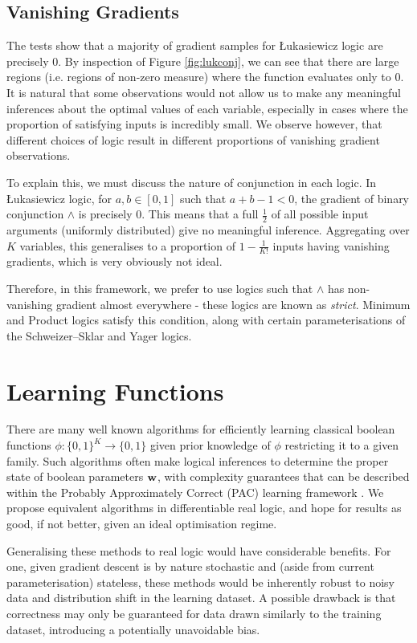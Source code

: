 \subsection{Vanishing Gradients}
\label{section:tnormzerograd}

The tests show that a majority of gradient samples for Łukasiewicz logic are precisely $0$. By inspection of Figure \ref{fig:lukconj}, we can see that there are large regions (i.e. regions of non-zero measure) where the function evaluates only to $0$. It is natural that some observations would not allow us to make any meaningful inferences about the optimal values of each variable, especially in cases where the proportion of satisfying inputs is incredibly small. We observe however, that different choices of logic result in different proportions of vanishing gradient observations.

To explain this, we must discuss the nature of conjunction in each logic. In Łukasiewicz logic, for $a, b \in [0,1]$ such that $a + b - 1 < 0$, the gradient of binary conjunction $\land$ is precisely $0$. This means that a full $\frac{1}{2}$ of all possible input arguments (uniformly distributed) give no meaningful inference. Aggregating over $K$ variables, this generalises to a proportion of $1 - \frac{1}{K!}$ inputs having vanishing gradients, which is very obviously not ideal.

Therefore, in this framework, we prefer to use logics such that $\land$ has non-vanishing gradient almost everywhere - these logics are known as \textit{strict}. Minimum and Product logics satisfy this condition, along with certain parameterisations of the Schweizer–Sklar and Yager logics.

\section{Learning Functions}

There are many well known algorithms for efficiently learning classical boolean functions $\phi : \{0,1\}^K \to \{0,1\}$ given prior knowledge of $\phi$ restricting it to a given family. Such algorithms often make logical inferences to determine the proper state of boolean parameters $\mathbf{w}$, with complexity guarantees that can be described within the Probably Approximately Correct (PAC) learning framework \cite{clt}. We propose equivalent algorithms in differentiable real logic, and hope for results as good, if not better, given an ideal optimisation regime. 

Generalising these methods to real logic would have considerable benefits. For one, given gradient descent is by nature stochastic and (aside from current parameterisation) stateless, these methods would be inherently robust to noisy data and distribution shift in the learning dataset. A possible drawback is that correctness may only be guaranteed for data drawn similarly to the training dataset, introducing a potentially unavoidable bias.

